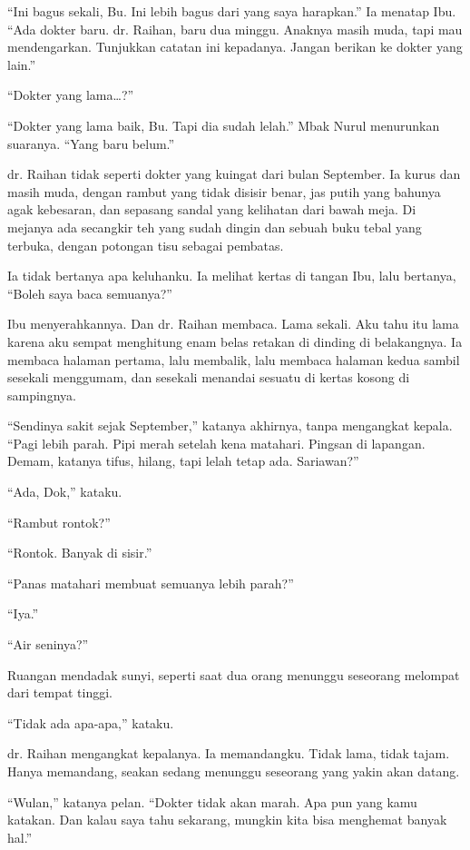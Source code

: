 \documentclass[11pt,twoside,openany]{book}
\makeatletter
\newcommand{\scenebreak}{\par\vspace{0.9em}{\centering\textsc{*\hspace{0.7em}*\hspace{0.7em}*}\par}\vspace{0.9em}\@afterindentfalse\@afterheading}
\makeatother
\begin{document}
``Ini bagus sekali, Bu. Ini lebih bagus dari yang saya harapkan.'' Ia menatap Ibu. ``Ada dokter baru. dr. Raihan, baru dua minggu. Anaknya masih muda, tapi mau mendengarkan. Tunjukkan catatan ini kepadanya. Jangan berikan ke dokter yang lain.''

``Dokter yang lama\ldots?''

``Dokter yang lama baik, Bu. Tapi dia sudah lelah.'' Mbak Nurul menurunkan suaranya. ``Yang baru belum.''

\scenebreak
dr. Raihan tidak seperti dokter yang kuingat dari bulan September. Ia kurus dan masih muda, dengan rambut yang tidak disisir benar, jas putih yang bahunya agak kebesaran, dan sepasang sandal yang kelihatan dari bawah meja. Di mejanya ada secangkir teh yang sudah dingin dan sebuah buku tebal yang terbuka, dengan potongan tisu sebagai pembatas.

Ia tidak bertanya apa keluhanku. Ia melihat kertas di tangan Ibu, lalu bertanya, ``Boleh saya baca semuanya?''

Ibu menyerahkannya. Dan dr. Raihan membaca. Lama sekali. Aku tahu itu lama karena aku sempat menghitung enam belas retakan di dinding di belakangnya. Ia membaca halaman pertama, lalu membalik, lalu membaca halaman kedua sambil sesekali menggumam, dan sesekali menandai sesuatu di kertas kosong di sampingnya.

``Sendinya sakit sejak September,'' katanya akhirnya, tanpa mengangkat kepala. ``Pagi lebih parah. Pipi merah setelah kena matahari. Pingsan di lapangan. Demam, katanya tifus, hilang, tapi lelah tetap ada. Sariawan?''

``Ada, Dok,'' kataku.

``Rambut rontok?''

``Rontok. Banyak di sisir.''

``Panas matahari membuat semuanya lebih parah?''

``Iya.''

``Air seninya?''

Ruangan mendadak sunyi, seperti saat dua orang menunggu seseorang melompat dari tempat tinggi.

``Tidak ada apa-apa,'' kataku.

dr. Raihan mengangkat kepalanya. Ia memandangku. Tidak lama, tidak tajam. Hanya memandang, seakan sedang menunggu seseorang yang yakin akan datang.

``Wulan,'' katanya pelan. ``Dokter tidak akan marah. Apa pun yang kamu katakan. Dan kalau saya tahu sekarang, mungkin kita bisa menghemat banyak hal.''
\end{document}
